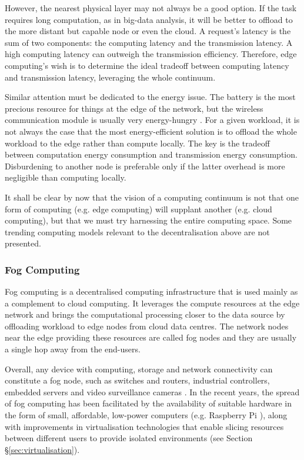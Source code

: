 \documentclass{ieeeaccess}
\begin{document}
However, the nearest physical layer may not always be a good option. If the task requires long computation, as in big-data analysis, it will be better to offload to the more distant but capable node or even the cloud. A request's latency is the sum of two components: the computing latency and the transmission latency. A high computing latency can outweigh the transmission efficiency. Therefore, edge computing's wish is to determine the ideal tradeoff between computing latency and transmission latency, leveraging the whole continuum.

Similar attention must be dedicated to the energy issue. The battery is the most precious resource for things at the edge of the network, but the wireless communication module is usually very energy-hungry \cite{edge-computing-vision-challenges}. For a given workload, it is not always the case that the most energy-efficient solution is to offload the whole workload to the edge rather than compute locally. The key is the tradeoff between computation energy consumption and transmission energy consumption. Disburdening to another node is preferable only if the latter overhead is more negligible than computing locally.

It shall be clear by now that the vision of a computing continuum is not that one form of computing (e.g. edge computing) will supplant another (e.g. cloud computing), but that we must try harnessing the entire computing space. Some trending computing models relevant to the decentralisation above are not presented.

\subsubsection{Fog Computing}

Fog computing \cite{fog-computing} is a decentralised computing infrastructure that is used mainly as a complement to cloud computing. It leverages the compute resources at the edge network and brings the computational processing closer to the data source by offloading workload to edge nodes from cloud data centres. The network nodes near the edge providing these resources are called fog nodes and they are usually a single hop away from the end-users.

Overall, any device with computing, storage and network connectivity can constitute a fog node, such as switches and routers, industrial controllers, embedded servers and video surveillance cameras \cite{camera-virtualisation}. In the recent years, the spread of fog computing has been facilitated by the availability of suitable hardware in the form of small, affordable, low-power computers (e.g. Raspberry Pi \cite{raspberry}), along with improvements in virtualisation technologies that enable slicing resources between different users to provide isolated environments (see Section §\ref{sec:virtualisation}).
\end{document}
